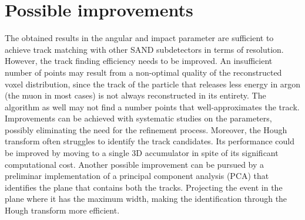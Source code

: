 \section{Possible improvements}
The obtained results in the angular and impact parameter are sufficient to achieve track matching with other SAND subdetectors in terms of resolution. However, the track finding efficiency needs to be improved.
An insufficient number of \lpc points may result from a non-optimal quality of the reconstructed voxel distribution, since the track of the particle that releases less energy in argon (the muon in most cases) is not always reconstructed in its entirety. 
The \lpc algorithm as well may not find a number points that well-approximates the track. Improvements can be achieved with systematic studies on the \lpc parameters, possibly eliminating the need for the refinement process.
Moreover, the Hough transform often struggles to identify the track candidates. Its performance could be improved by moving to a single 3D accumulator in spite of its significant computational cost.
Another possible improvement can be pursued by a preliminar implementation of a principal component analysis (PCA) that identifies the plane that contains both the tracks. Projecting the event in the plane where it has the maximum width, making the identification through the Hough transform more efficient.
